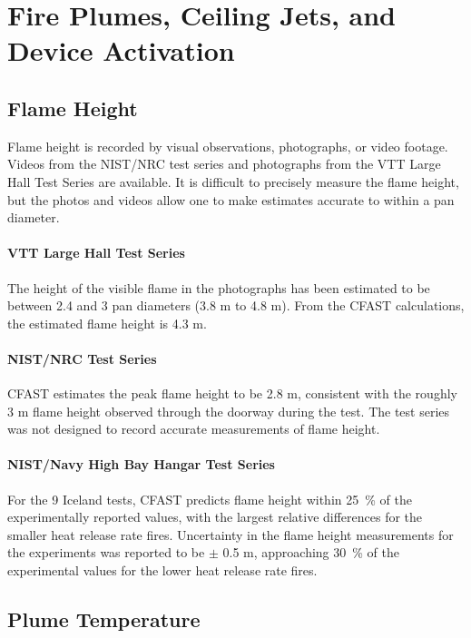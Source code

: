 \chapter{Fire Plumes, Ceiling Jets, and Device Activation}

\section{Flame Height}

Flame height is recorded by visual observations, photographs, or video footage.  Videos from the NIST/NRC test series and photographs from the VTT Large Hall Test Series are available.  It is difficult to precisely measure the flame height, but the photos and videos allow one to make estimates accurate to within a pan diameter.

\subsubsection{VTT Large Hall Test Series}

The height of the visible flame in the photographs has been estimated to be between 2.4 and 3 pan diameters (3.8 m to 4.8 m).  From the CFAST calculations, the estimated flame height is 4.3 m.

\subsubsection{NIST/NRC Test Series}

CFAST estimates the peak flame height to be 2.8 m, consistent with the roughly 3 m flame height observed through the doorway during the test.  The test series was not designed to record accurate measurements of flame height.

\subsubsection{NIST/Navy High Bay Hangar Test Series}

For the 9 Iceland tests, CFAST predicts flame height within 25~\% of the experimentally reported values, with the largest relative differences for the smaller heat release rate fires. Uncertainty in the flame height measurements for the experiments was reported to be $\pm$ 0.5 m, approaching 30~\% of the experimental values for the lower heat release rate fires.

\section{Plume Temperature}

